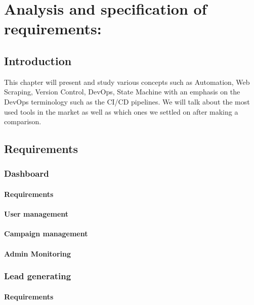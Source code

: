 \chapter{Analysis and specification of requirements:}
\newpage

\setcounter{secnumdepth}{0} %
\section{Introduction}
This chapter will present and study various concepts such as Automation, Web Scraping, Version Control, DevOps, State Machine with an emphasis on the DevOps terminology such as the CI/CD pipelines. We will talk about the most used tools in the market as well as which ones we settled on after making a comparison.

\setcounter{secnumdepth}{3} %

\section{Requirements}
\subsection{Dashboard}
\subsubsection{Requirements}
\subsubsection{User management}
\subsubsection{Campaign management}
\subsubsection{Admin Monitoring}
\subsection{Lead generating}
\subsubsection{Requirements}
